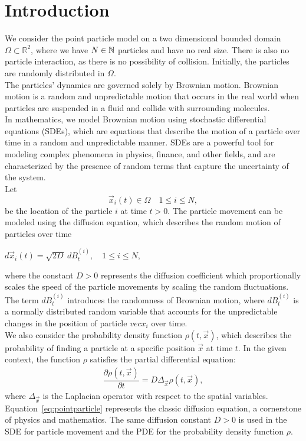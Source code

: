 \section{Introduction}
We consider the point particle model on a two dimensional bounded domain $\Omega \subset \mathbb{R}^2$, where we have $N \in \mathbb{N}$ particles and have no real size.
There is also no particle interaction, as there is no possibility of collision. 
Initially, the particles are randomly distributed in $\Omega$. \\
The particles' dynamics are governed solely by Brownian motion.
Brownian motion is a random and unpredictable motion that occurs in the real world when particles are suspended in a fluid and collide with surrounding molecules. \\
In mathematics, we model Brownian motion using stochastic differential equations (SDEs), which are equations that describe the motion of a particle over time in a random and unpredictable manner. 
SDEs are a powerful tool for modeling complex phenomena in physics, finance, and other fields, and are characterized by the presence of random terms that capture the uncertainty of the system. \\
Let 
\[\vec{x}_i(t) \in \Omega \quad 1 \leq i \leq N,\]
be the location of the particle $i$ at time $t > 0$. 
The particle movement can be modeled using the diffusion equation, which describes the random motion of particles over time
\begin{center}
	$d\vec{x}_i(t) = \sqrt{2D} \: dB_t^{(i)}, \quad 1 \leq i \leq N$,
\end{center}
where the constant $D > 0$ represents the diffusion coefficient which proportionally scales the speed of the particle movements by scaling the random fluctuations.
The term $dB_t^{(i)}$ introduces the randomness of Brownian motion, where $dB_t^{(i)}$ is a normally distributed random variable that accounts for the unpredictable changes in the position of particle $vec{x}_i$ over time. \\
We also consider the probability density function $\rho(t, \vec{x})$, which describes the probability of finding a particle at a specific position $\vec{x}$ at time $t$.
In the given context, the function $\rho$ satisfies the partial differential equation:
\begin{align}
	\dfrac{\partial \rho (t, \vec{x})}{\partial t} = D \Delta_{\vec{x}} \rho(t, \vec{x}) \label{eq:pointparticle}, 
\end{align}
where $\Delta_{\vec{x}}$ is the Laplacian operator with respect to the spatial variables. \\
Equation~\eqref{eq:pointparticle} represents the classic diffusion equation, a cornerstone of physics and mathematics.
The same diffusion constant $D>0$ is used in the SDE for particle movement and the PDE for the probability density function $\rho$. \\

